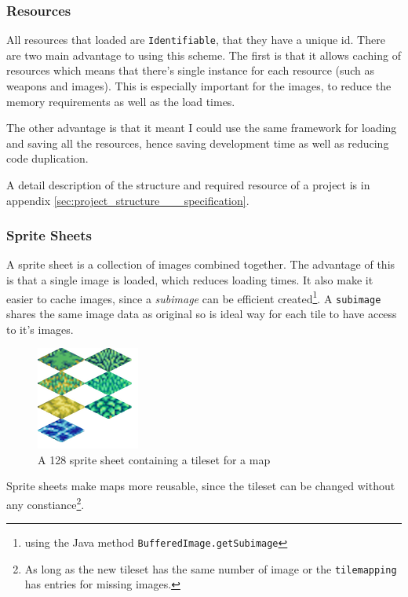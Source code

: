 
\subsubsection{Resources}

All resources that loaded are \texttt{Identifiable}, that they have a unique id.  There are two main advantage to using this scheme. The first is that it allows caching of resources which means that there's single instance for each resource (such as weapons and images). This is especially important for the images, to reduce the memory requirements as well as the load times.

The other advantage is that it meant I could use the same framework for loading and saving all the resources, hence saving development time as well as reducing code duplication. 

A detail description of the structure and  required resource of a project is in appendix \ref{sec:project_structure___specification}.

\subsubsection{Sprite Sheets}
\label{ssub:sprite_sheets}


A sprite sheet is a collection of images combined together. The advantage of this is that a single image is loaded, which reduces loading times. It also make it easier to cache images, since a \emph{subimage} can be efficient created\footnote{using the Java method \texttt{BufferedImage.getSubimage}}. A \texttt{subimage} shares the same image data as original so is ideal way for each tile to have access to it's images\cite{bufferedImage}.    

\begin{figure}[htbp]
	\centering
		\includegraphics{figures/tileset.png}
	\caption{A 128 sprite sheet containing a tileset for a map}
	\label{fig:figures_tileset}
\end{figure}

Sprite sheets make maps more reusable, since the tileset can be changed without any constiance\footnote{As long as the new tileset has the same number of image or the \texttt{tilemapping} has entries for missing images.}.  

